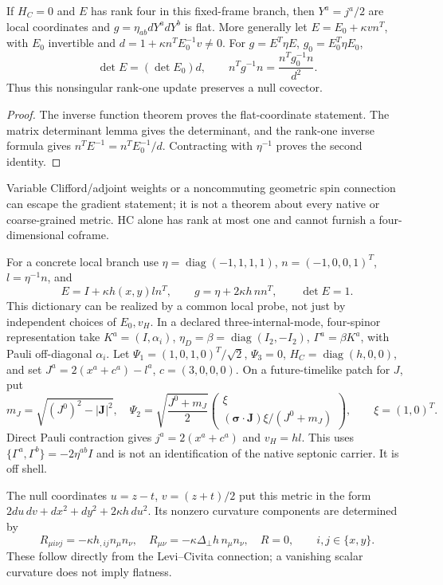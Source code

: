 \begin{proposition}
\label{v480:hc-null-coframe}
If $H_C=0$ and $E$ has rank four in this fixed-frame branch, then
$Y^a=j^a/2$ are local coordinates and $g=\eta_{ab}dY^a dY^b$
is flat. More generally let $E=E_0+\kappa v n^T$, with $E_0$
invertible and $d=1+\kappa n^TE_0^{-1}v\ne0$. For
$g=E^T\eta E$, $g_0=E_0^T\eta E_0$,
\[
 \det E=(\det E_0)d,\qquad
 n^Tg^{-1}n=\frac{n^Tg_0^{-1}n}{d^2}.
\]
Thus this nonsingular rank-one update preserves a null covector.
\end{proposition}
\begin{proof}
The inverse function theorem proves the flat-coordinate statement.
The matrix determinant lemma gives the determinant, and the rank-one
inverse formula gives $n^TE^{-1}=n^TE_0^{-1}/d$. Contracting with
$\eta^{-1}$ proves the second identity.
\end{proof}

Variable Clifford/adjoint weights or a noncommuting geometric spin
connection can escape the gradient statement; it is not a theorem
about every native or coarse-grained metric. HC alone has rank at
most one and cannot furnish a four-dimensional coframe.

For a concrete local branch use $\eta=\operatorname{diag}(-1,1,1,1)$,
$n=(-1,0,0,1)^T$, $l=\eta^{-1}n$, and
\[
 E=I+\kappa h(x,y)ln^T,\qquad
 g=\eta+2\kappa h\,nn^T,\qquad \det E=1.
\]
This dictionary can be realized by a common local probe, not just by
independent choices of $E_0,v_H$. In a declared three-internal-mode,
four-spinor representation take $K^a=(I,\alpha_i)$,
$\eta_D=\beta=\operatorname{diag}(I_2,-I_2)$,
$\Gamma^a=\beta K^a$, with Pauli off-diagonal $\alpha_i$.
Let $\Psi_1=(1,0,1,0)^T/\sqrt2$, $\Psi_3=0$,
$H_C=\operatorname{diag}(h,0,0)$, and set
$J^a=2(x^a+c^a)-l^a$, $c=(3,0,0,0)$.
On a future-timelike patch for $J$, put
\[
 m_J=\sqrt{(J^0)^2-|\boldsymbol J|^2},\quad
 \Psi_2=\sqrt{\frac{J^0+m_J}{2}}
 \begin{pmatrix}\xi\\
 (\boldsymbol\sigma\mathbin{\cdot}\boldsymbol J)\xi/(J^0+m_J)
 \end{pmatrix},\qquad \xi=(1,0)^T.
\]
Direct Pauli contraction gives $j^a=2(x^a+c^a)$ and $v_H=hl$.
This uses $\{\Gamma^a,\Gamma^b\}=-2\eta^{ab}I$ and is not
an identification of the native septonic carrier. It is off shell.

The null coordinates $u=z-t$, $v=(z+t)/2$ put this metric in the
form $2du\,dv+dx^2+dy^2+2\kappa h\,du^2$. Its nonzero curvature
components are determined by
\[
 R_{\mu i\nu j}=-\kappa h_{,ij}n_\mu n_\nu,\quad
 R_{\mu\nu}=-\kappa\Delta_\perp h\,n_\mu n_\nu,\quad R=0,
 \qquad i,j\in\{x,y\}.
\]
These follow directly from the Levi--Civita connection; a vanishing
scalar curvature does not imply flatness.

